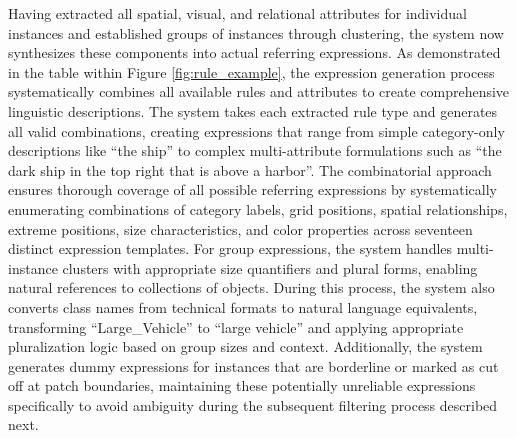 Having extracted all spatial, visual, and relational attributes for individual instances and established groups of instances through clustering, the system now synthesizes these components into actual referring expressions. As demonstrated in the table within Figure \ref{fig:rule_example}, the expression generation process systematically combines all available rules and attributes to create comprehensive linguistic descriptions. The system takes each extracted rule type and generates all valid combinations, creating expressions that range from simple category-only descriptions like ``the ship'' to complex multi-attribute formulations such as ``the dark ship in the top right that is above a harbor''. The combinatorial approach ensures thorough coverage of all possible referring expressions by systematically enumerating combinations of category labels, grid positions, spatial relationships, extreme positions, size characteristics, and color properties across seventeen distinct expression templates. For group expressions, the system handles multi-instance clusters with appropriate size quantifiers and plural forms, enabling natural references to collections of objects. During this process, the system also converts class names from technical formats to natural language equivalents, transforming ``Large\_Vehicle'' to ``large vehicle'' and applying appropriate pluralization logic based on group sizes and context. Additionally, the system generates dummy expressions for instances that are borderline or marked as cut off at patch boundaries, maintaining these potentially unreliable expressions specifically to avoid ambiguity during the subsequent filtering process described next.

